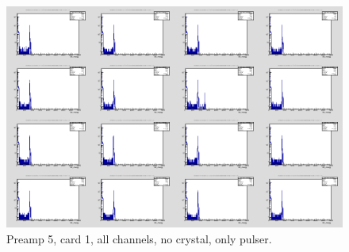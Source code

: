 \documentclass{report}
\begin{document}
\begin{figure}[!htb]
  \includegraphics[width=\linewidth]{preamp5_lim_energy_card1_all.png}
  \caption{Preamp 5, card 1, all channels, no crystal, only pulser.}
\end{figure}
\end{document}
